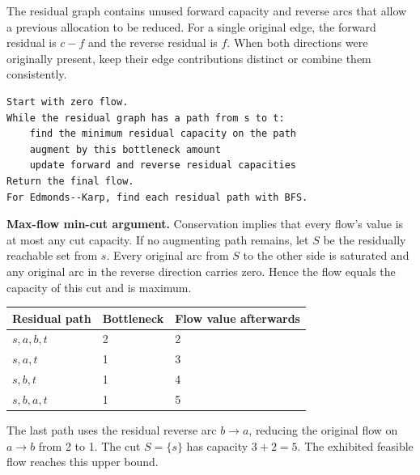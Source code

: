 \documentclass[12pt,a4paper]{article}
\begin{document}
The residual graph contains unused forward capacity and reverse arcs that allow a previous allocation to be reduced. For a single original edge, the forward residual is $c-f$ and the reverse residual is $f$. When both directions were originally present, keep their edge contributions distinct or combine them consistently.
\begin{tcolorbox}[formulabox, title={Ford--Fulkerson and Edmonds--Karp}]
\begin{verbatim}
Start with zero flow.
While the residual graph has a path from s to t:
    find the minimum residual capacity on the path
    augment by this bottleneck amount
    update forward and reverse residual capacities
Return the final flow.
For Edmonds--Karp, find each residual path with BFS.
\end{verbatim}
\end{tcolorbox}

\textbf{Max-flow min-cut argument.} Conservation implies that every flow's value is at most any cut capacity. If no augmenting path remains, let $S$ be the residually reachable set from $s$. Every original arc from $S$ to the other side is saturated and any original arc in the reverse direction carries zero. Hence the flow equals the capacity of this cut and is maximum.
\begin{tcolorbox}[tikzbox, title={Flow network for the augmenting-path trace}]
\centering
{}\par
\end{tcolorbox}

\begin{tcolorbox}[examplebox, title={Augmenting paths with cancellation}]
\par\vspace{5pt}
\begingroup
\setlength{\extrarowheight}{1pt}
\noindent\begin{tabularx}{\linewidth}{|B{3.45cm}|Y|Y|}
\hline
\textbf{Residual path} & \textbf{Bottleneck} & \textbf{Flow value afterwards} \\ \hline
$s,a,b,t$ & 2 & 2 \\ \hline
$s,a,t$ & 1 & 3 \\ \hline
$s,b,t$ & 1 & 4 \\ \hline
$s,b,a,t$ & 1 & 5 \\ \hline
\end{tabularx}\par
\endgroup
The last path uses the residual reverse arc $b\to a$, reducing the original flow on $a\to b$ from 2 to 1. The cut $S=\{s\}$ has capacity $3+2=5$. The exhibited feasible flow reaches this upper bound.
\end{tcolorbox}
\end{document}
